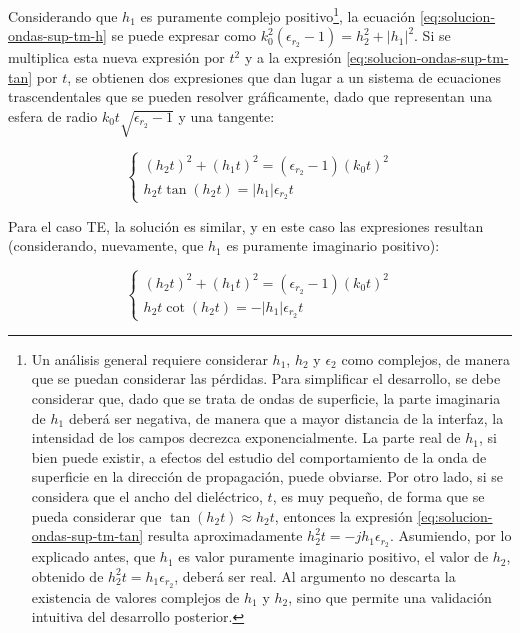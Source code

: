 Considerando que $h_1$ es puramente complejo positivo\footnote{Un análisis general requiere considerar $h_1$, $h_2$ y $\epsilon_2$ como complejos, de manera que se puedan considerar las pérdidas. Para simplificar el desarrollo, se debe considerar que, dado que se trata de ondas de superficie, la parte imaginaria de $h_1$ deberá ser negativa, de manera que a mayor distancia de la interfaz, la intensidad de los campos decrezca exponencialmente. La parte real de $h_1$, si bien puede existir, a efectos del estudio del comportamiento de la onda de superficie en la dirección de propagación, puede obviarse. Por otro lado, si se considera que el ancho del dieléctrico, $t$, es muy pequeño, de forma que se pueda considerar que $\tan(h_2 t) \approx h_2 t$, entonces la expresión \ref{eq:solucion-ondas-sup-tm-tan} resulta aproximadamente $h_2^2 t = -j h_1 \epsilon_{r_2}$. Asumiendo, por lo explicado antes, que $h_1$ es valor puramente imaginario positivo, el valor de $h_2$, obtenido de $h_2^2 t = h_1 \epsilon_{r_2}$, deberá ser real. Al argumento no descarta la existencia de valores complejos de $h_1$ y $h_2$, sino que permite una validación intuitiva del desarrollo posterior.}, la ecuación \ref{eq:solucion-ondas-sup-tm-h} se puede expresar como $k_0^2 (\epsilon_{r_2}-1) = h_2^2 + |h_1|^2$. Si se multiplica esta nueva expresión por $t^2$ y a la expresión \ref{eq:solucion-ondas-sup-tm-tan} por $t$, se obtienen dos expresiones que dan lugar a un sistema de ecuaciones trascendentales que se pueden resolver gráficamente, dado que representan una esfera de radio $k_0 t \sqrt{\epsilon_{r_2}-1}$ y una tangente:

\begin{equation}
	\label{eq:sistema-ondas-superficiales-TM}
	\begin{cases}
		(h_2 t)^2 + (h_1 t)^2 = (\epsilon_{r_2} - 1) (k_0 t)^2\\
		h_2 t \tan (h_2 t) = |h_1| \epsilon_{r_2} t
	\end{cases}
\end{equation}

Para el caso TE, la solución es similar, y en este caso las expresiones resultan (considerando, nuevamente, que $h_1$ es puramente imaginario positivo):

\begin{equation}
	\label{eq:sistema-ondas-superficiales-TE}
	\begin{cases}
		(h_2 t)^2 + (h_1 t)^2 = (\epsilon_{r_2} - 1) (k_0 t)^2 \\
		h_2 t \cot (h_2 t) = -|h_1| \epsilon_{r_2} t
	\end{cases}
\end{equation}

